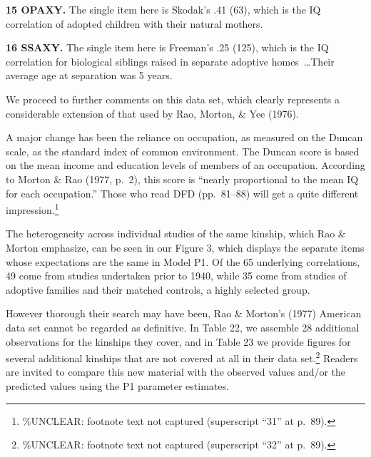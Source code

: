 ﻿\documentclass[12pt]{article}
\begin{document}
\textbf{15 OPAXY.} The single item here is Skodak's .41 (63), which is the IQ correlation of adopted children with their natural mothers.

\textbf{16 SSAXY.} The single item here is Freeman's .25 (125), which is the IQ correlation for biological siblings raised in separate adoptive homes~\ldots Their average age at separation was 5 years.

We proceed to further comments on this data set, which clearly represents a considerable extension of that used by Rao, Morton, \& Yee (1976).

A major change has been the reliance on occupation, as measured on the Duncan scale, as the standard index of common environment. The Duncan score is based on the mean income and education levels of members of an occupation. According to Morton \& Rao (1977, p.\ 2), this score is ``nearly proportional to the mean IQ for each occupation.'' Those who read DFD (pp.\ 81--88) will get a quite different impression.\footnote{\%UNCLEAR: footnote text not captured (superscript ``31'' at p.\ 89).}

The heterogeneity across individual studies of the same kinship, which Rao \& Morton emphasize, can be seen in our Figure 3, which displays the separate items whose expectations are the same in Model P1. Of the 65 underlying correlations, 49 come from studies undertaken prior to 1940, while 35 come from studies of adoptive families and their matched controls, a highly selected group.


However thorough their search may have been, Rao \& Morton's (1977) American data set cannot be regarded as definitive. In Table 22, we assemble 28 additional observations for the kinships they cover, and in Table 23 we provide figures for several additional kinships that are not covered at all in their data set.\footnote{\%UNCLEAR: footnote text not captured (superscript ``32'' at p.\ 89).} Readers are invited to compare this new material with the observed values and/or the predicted values using the P1 parameter estimates.
\end{document}
